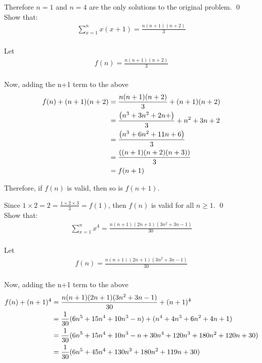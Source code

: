\documentclass[a4paper,12pt]{article}
\begin{document}
\begin{question}
Therefore $n=1$ and $n=4$ are the only solutions to the original problem.  \hfill \qed\\[1cm]

\qpart[3]
\qsubpart
Show that:
\begin{gather*}
	 \sum_{x=1}^{n}x(x+1)=\frac{n(n+1)(n+2)}{3}\\
\end{gather*}


Let
\begin{gather*}
	f(n)=\frac{n(n+1)(n+2)}{3}\\
\end{gather*}

Now, adding the n+1 term to the above
\begin{gather}\notag
\begin{aligned}
	f(n)+(n+1)(n+2)&=\frac{n(n+1)(n+2)}{3}+(n+1)(n+2)\\
	&=\frac{\left(n^3+3n^2+2n+\right)}{3}+n^2+3n+2\\
	&=\frac{\left(n^3+6n^2+11n+6\right)}{3}\\
	&=\frac{\left((n+1)(n+2)(n+3)\right)}{3}\\
	&=f(n+1)
\end{aligned}
\end{gather}

Therefore, if $f(n)$ is valid, then so is $f(n+1)$.

Since $1\times2=2=\frac{1\times2\times3}{3}=f(1)$, then $f(n)$ is valid for all $n\geq1$. \hfill \qed\\[1cm]

\qsubpart
Show that:
\begin{gather*}
	 \sum_{x=1}^{n}x^4=\frac{n(n+1)(2n+1)(3n^2+3n-1)}{30}\\
\end{gather*}


Let
\begin{gather*}
	f(n)=\frac{n(n+1)(2n+1)(3n^2+3n-1)}{30}\\
\end{gather*}

Now, adding the n+1 term to the above
\begin{align}
	f(n)+(n+1)^4&=\frac{n(n+1)(2n+1)(3n^2+3n-1)}{30}+(n+1)^4\notag \\
	&=\frac{1}{30}(6n^5+15n^4+10n^3-n)+(n^4+4n^3+6n^2+4n+1)\notag \\
	&=\frac{1}{30}(6n^5+15n^4+10n^3-n+30n^4+120n^3+180n^2+120n+30)\notag \\
	&=\frac{1}{30}(6n^5+45n^4+130n^3+180n^2+119n+30)\label{a}
\end{align}


\end{question}
\end{document}
